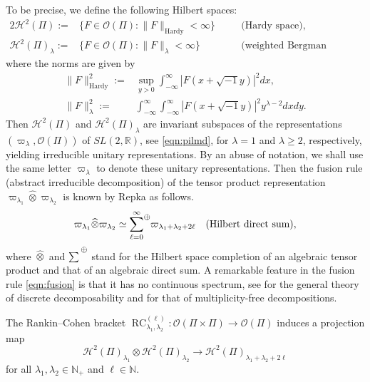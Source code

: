 \documentclass[12pt]{amsart}
\newcommand{\RC}{\operatorname{RC}}
\theoremstyle{plain} %
\theoremstyle{definition} %
\theoremstyle{remark} %
\begin{document}
To be precise, 
 we define the following Hilbert spaces:
\begin{alignat*}{2}
{\mathcal{H}}^2(\Pi):=&\{F \in {\mathcal{O}}(\Pi):\|F\|_{\text{Hardy}}<\infty\}
\quad
&&\text{(Hardy space), }
\\
{\mathcal{H}}^2(\Pi)_{\lambda}
:=&\{F \in {\mathcal{O}}(\Pi):\|F\|_{\lambda}<\infty\}
\quad
&&\text{(weighted Bergman spaces),   }
\end{alignat*}
where the norms are given by
\begin{align*}
\|F\|_{\text{Hardy}}^2:=&
\sup_{y>0} \int_{-\infty}^{\infty} |F(x+\sqrt{-1}y)|^2d x, 
\\
\|F\|_{\lambda}^2:=&
\int_{-\infty}^{\infty}\int_{-\infty}^{\infty} |F(x+\sqrt{-1}y)|^2 y^{\lambda-2} d x d y.  
\end{align*}
Then ${\mathcal{H}}^2(\Pi)$ and ${\mathcal{H}}^2(\Pi)_{\lambda}$ are
 invariant subspaces 
 of the representations $(\varpi_{\lambda}, {\mathcal{O}}(\Pi))$
 of $SL(2,{\mathbb{R}})$, 
 see \eqref{eqn:pilmd}, 
 for $\lambda=1$ and $\lambda \ge 2$, 
 respectively, 
 yielding irreducible unitary representations.  
By an abuse of notation, 
 we shall use the same letter $\varpi_{\lambda}$
 to denote these unitary representations.  
Then the fusion rule (abstract irreducible decomposition)
 of the tensor product representation $\varpi_{\lambda_1} \widehat \otimes \varpi_{\lambda_2}$ is known
 by Repka \cite{Re79} as follows.  
\begin{equation}
\label{eqn:fusion}
 \varpi_{\lambda_1} \widehat \otimes \varpi_{\lambda_2}
  \simeq 
  {\sum_{\ell=0}^{\infty}}{\raisebox{.8em}{\text{\footnotesize{$\oplus$}}}} \varpi_{\lambda_1+\lambda_2+2\ell}
\quad
\text{(Hilbert direct sum)},
\end{equation}
where $\widehat \otimes$ and $\sum{\raisebox{.8em}{\text{\footnotesize{$\oplus$}}}}$ stand for the Hilbert space completion
 of an algebraic tensor product
 and that of an algebraic direct sum.  
A remarkable feature in the fusion rule \eqref{eqn:fusion} is 
 that it has no continuous spectrum, 
 see \cite{xkAnn98}
 for the general theory
 of discrete decomposability
 and \cite{xrims40}
 for that of multiplicity-free decompositions.  



The Rankin--Cohen bracket 
 $\RC_{\lambda_1, \lambda_2}^{(\ell)} \colon {\mathcal{O}}(\Pi \times \Pi) \to 
{\mathcal{O}}(\Pi)$
 induces a projection map
\[
   {\mathcal{H}}^2(\Pi)_{\lambda_1} \otimes {\mathcal{H}}^2(\Pi)_{\lambda_2}
   \to 
   {\mathcal{H}}^2(\Pi)_{\lambda_1 + \lambda_2+ 2 \ell}
\]
 for all $\lambda_1, \lambda_2 \in {\mathbb{N}}_+$
 and $\ell \in {\mathbb{N}}$.  
\end{document}
